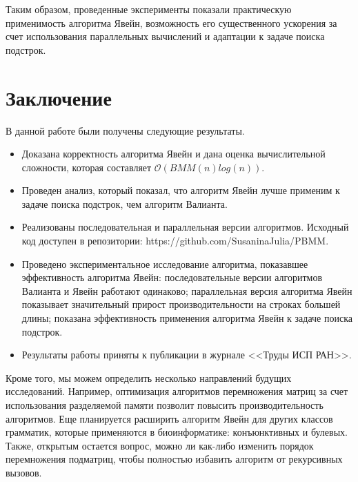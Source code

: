 \documentclass[14pt]{matmex-diploma-custom}
\begin{document}
\BlankLine
\BlankLine
\BlankLine
\BlankLine
\BlankLine
\BlankLine

Таким образом, проведенные эксперименты показали практическую применимость алгоритма Явейн, возможность его существенного ускорения за счет использования параллельных вычислений и адаптации к задаче поиска подстрок.

\section{Заключение}
В данной работе были получены следующие результаты.

\begin{itemize}
	\item Доказана корректность алгоритма Явейн и дана оценка вычислительной сложности, которая составляет $\mathcal{O}(BMM(n)log(n))$.
	\item Проведен анализ, который показал, что алгоритм Явейн лучше применим к задаче поиска подстрок, чем алгоритм Валианта.
	\item Реализованы последовательная и параллельная версии алгоритмов. Исходный код доступен в репозитории: https://github.com/SusaninaJulia/PBMM.
	\item Проведено экспериментальное исследование алгоритма, показавшее эффективность алгоритма Явейн: последовательные версии алгоритмов Валианта и Явейн работают одинаково; параллельная версия алгоритма Явейн показывает значительный прирост производительности на строках большей длины; показана эффективность применения алгоритма Явейн к задаче поиска подстрок.
	\item Результаты работы приняты к публикации в журнале <<Труды ИСП РАН>>.
\end{itemize}

Кроме того, мы можем определить несколько направлений будущих исследований. 
Например, оптимизация алгоритмов перемножения матриц за счет использования разделяемой памяти позволит повысить производительность алгоритмов.
Еще планируется расширить алгоритм Явейн для других классов грамматик, которые применяются в биоинформатике: конъюнктивных и булевых.
Также, открытым остается вопрос, можно ли как-либо изменить порядок перемножения подматриц, чтобы полностью избавить алгоритм от рекурсивных вызовов.

\setmonofont[Mapping=tex-text]{CMU Typewriter Text}


\end{document}
